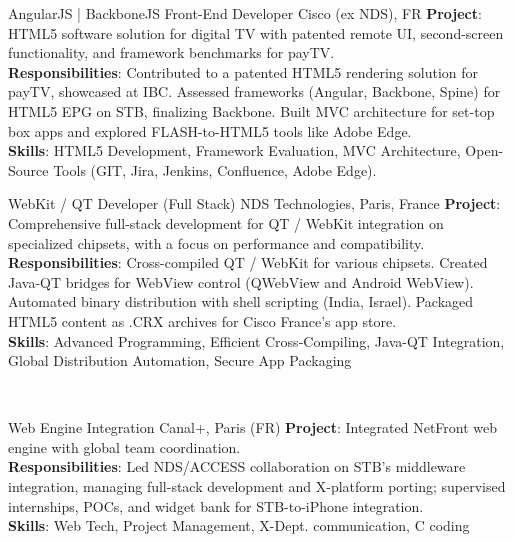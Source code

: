 \documentclass[
  a4paper,
   maincolor=cvblue,
   sectioncolor=cvblue,
]{fortysecondscv}
\begin{document}
\begin{cvtable}
    {AngularJS | BackboneJS Front-End Developer}
    {Cisco (ex NDS), FR}
    {
      \textbf{Project}: HTML5 software solution for digital TV with patented remote UI, second-screen functionality, and framework benchmarks for payTV.\\
      \textbf{Responsibilities}:
          Contributed to a patented HTML5 rendering solution for payTV, showcased at IBC. Assessed frameworks (Angular, Backbone, Spine) for HTML5 EPG on STB, finalizing Backbone. Built MVC architecture for set-top box apps and explored FLASH-to-HTML5 tools like Adobe Edge.\\
      \textbf{Skills}: HTML5 Development, Framework Evaluation, MVC Architecture, Open-Source Tools (GIT, Jira, Jenkins, Confluence, Adobe Edge).\\
    }
\end{cvtable}


\begin{cvtable}
    {WebKit / QT Developer (Full Stack)}
    {NDS Technologies, Paris, France}
    {
      \textbf{Project}: Comprehensive full-stack development for QT / WebKit integration on specialized chipsets, with a focus on performance and compatibility.\\
      \textbf{Responsibilities}:
          Cross-compiled QT / WebKit for various chipsets. Created Java-QT bridges for WebView control (QWebView and Android WebView). Automated binary distribution with shell scripting (India, Israel). Packaged HTML5 content as .CRX archives for Cisco France’s app store.\\
      \textbf{Skills}: Advanced Programming, Efficient Cross-Compiling, Java-QT Integration, Global Distribution Automation, Secure App Packaging\\
    }
\end{cvtable}
\\
\begin{cvtable}
    {Web Engine Integration}
    {Canal+, Paris (FR)}
    {
      \textbf{Project}: Integrated NetFront web engine with global team coordination.\\
      \textbf{Responsibilities}:
          Led NDS/ACCESS collaboration on STB's middleware integration, managing full-stack development and X-platform porting; supervised internships, POCs, and widget bank for STB-to-iPhone integration.\\
      \textbf{Skills}: Web Tech, Project Management, X-Dept. communication, C coding\\
    }
\end{cvtable}
\end{document}
